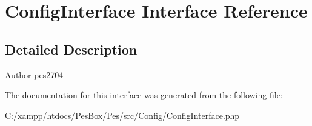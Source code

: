 \hypertarget{interface_pes_1_1_config_1_1_config_interface}{}\section{Config\+Interface Interface Reference}
\label{interface_pes_1_1_config_1_1_config_interface}


\subsection{Detailed Description}
\begin{DoxyAuthor}{Author}
pes2704 
\end{DoxyAuthor}


The documentation for this interface was generated from the following file\+:\begin{DoxyCompactItemize}
\item 
C\+:/xampp/htdocs/\+Pes\+Box/\+Pes/src/\+Config/Config\+Interface.\+php\end{DoxyCompactItemize}
